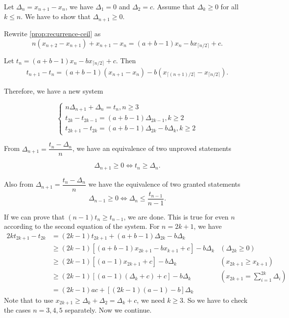 Let $\Delta_n = x_{n+1} - x_n$, we have $\Delta_1=0$ and $\Delta_2 = c$. Assume that $\Delta_k \ge 0$ for all $k \le n$. We have to show that $\Delta_{n+1} \ge 0$.

Rewrite \ref{prop:recurrence-ceil} as
\begin{equation}
  n(x_{n+2} - x_{n+1}) + x_{n+1} - x_n = (a+b-1)x_n - b x_{\lceil n/2\rceil} + c.
\end{equation}

Let $t_n = (a+b-1)x_n - b x_{\lceil n/2\rceil} + c$. Then
\begin{align*}
  t_{n+1} - t_n = (a+b-1)(x_{n+1} - x_n) - b(x_{\lceil (n+1)/2\rceil} - x_{\lceil n/2\rceil}).
\end{align*}

Therefore, we have a new system

$$\begin{cases}
    n\Delta_{n+1} + \Delta_n = t_n, n\ge 3           \\
    t_{2k} - t_{2k-1} = (a+b-1)\Delta_{2k-1}, k\ge 2 \\
    t_{2k+1} - t_{2k} = (a+b-1)\Delta_{2k} - b\Delta_{k}, k\ge 2
  \end{cases}$$

From $\Delta_{n+1} = \dfrac{t_n - \Delta_n}{n}$, we have an equivalence of two unproved statements

$$\Delta_{n+1} \ge 0 \iff t_n \ge \Delta_n.$$


Also from $\Delta_{n+1} = \dfrac{t_n - \Delta_n}{n}$ we have the equivalence of two granted statements
$$\Delta_{n-1} \ge 0 \iff \Delta_{n} \le \dfrac{t_{n-1}}{n-1}.$$

If we can prove that $(n-1)t_n \ge t_{n-1}$, we are done. This is true for even $n$ according to the second equation of the system. For $n=2k+1$, we have
\begin{align*}
  2k t_{2k+1} - t_{2k}
   & = (2k-1)t_{2k+1} + (a+b-1)\Delta_{2k} - b\Delta_{k}                                                         \\
   & \ge (2k-1)[(a+b-1)x_{2k+1} - bx_{k+1} + c] - b\Delta_{k} & (\Delta_{2k} \ge 0)                              \\
   & \ge (2k-1)[(a-1)x_{2k+1} + c] - b\Delta_{k}              & (x_{2k+1} \ge x_{k+1})                           \\
   & \ge (2k-1)[(a-1)(\Delta_k + c)+c] - b\Delta_{k}          & \left(x_{2k+1}=\sum_{i=1}^{2k} \Delta_{i}\right) \\
   & = (2k-1)ac + [(2k-1)(a-1)-b]\Delta_k
\end{align*}
Note that to use $x_{2k+1}\ge \Delta_k + \Delta_2 = \Delta_k + c$, we need $k\ge 3$. So we have to check the cases $n=3,4,5$ separately. Now we continue.

